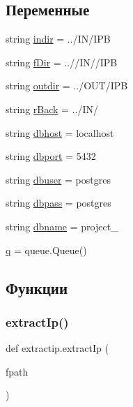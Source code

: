 \subsection*{Переменные}
\begin{DoxyCompactItemize}
\item 
string \hyperlink{namespaceextractip_a3145a105043353658277d58cb99ff1c6}{indir} = \textquotesingle{}../IN/I\+PB\textquotesingle{}
\item 
string \hyperlink{namespaceextractip_afc77b990583eaef27725f54b1e371fd4}{f\+Dir} = \textquotesingle{}..//IN//I\+PB\textquotesingle{}
\item 
string \hyperlink{namespaceextractip_a990ac0d0fba3b9b0eff9e0538af6d7cf}{outdir} = \textquotesingle{}../O\+UT/I\+PB\textquotesingle{}
\item 
string \hyperlink{namespaceextractip_acbf601a19f64d09908d5ab149094b94d}{r\+Back} = \textquotesingle{}../IN/\textquotesingle{}
\item 
string \hyperlink{namespaceextractip_ac577365c0a3822c9a30c2f72ecd62c18}{dbhost} = \textquotesingle{}localhost\textquotesingle{}
\item 
string \hyperlink{namespaceextractip_a37c1fd9eb8523d6a57cbd077d2075be2}{dbport} = \textquotesingle{}5432\textquotesingle{}
\item 
string \hyperlink{namespaceextractip_ae958c259d1ade44ffc42dc20f7d4b3ab}{dbuser} = \textquotesingle{}postgres\textquotesingle{}
\item 
string \hyperlink{namespaceextractip_a1cc5f8cfee8451384713192bae5cf558}{dbpass} = \textquotesingle{}postgres\textquotesingle{}
\item 
string \hyperlink{namespaceextractip_a9394808f1a48ea90bfa2bb86c76d01ad}{dbname} = \textquotesingle{}project\+\_\textquotesingle{}
\item 
\hyperlink{namespaceextractip_a2cf221bd199a42f6c0e3a42cba40b841}{q} = queue.\+Queue()
\end{DoxyCompactItemize}


\subsection{Функции}
\mbox{\label{namespaceextractip_a618ef8385421a257b0d4e90b39fd6050}} 
\subsubsection{\texorpdfstring{extract\+Ip()}{extractIp()}}
{\footnotesize\ttfamily def extractip.\+extract\+Ip (\begin{DoxyParamCaption}\item[{}]{fpath }\end{DoxyParamCaption})}



